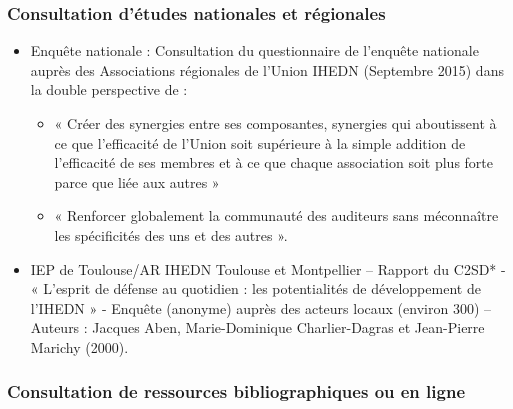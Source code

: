 \documentclass[10pt,a4paper]{article}
\begin{document}
\subsubsection{Consultation d'études nationales et régionales}

\begin{itemize}
\item Enquête nationale : Consultation du questionnaire de l'enquête nationale auprès des Associations régionales de l'Union IHEDN (Septembre 2015) dans la double perspective de :

\begin{itemize}
\item « Créer des synergies entre ses composantes, synergies qui aboutissent à ce que l'efficacité de l'Union soit supérieure à la simple addition de l'efficacité de ses membres et à ce que chaque association soit plus forte parce que liée aux autres »
\item « Renforcer globalement la communauté des auditeurs sans méconnaître les spécificités des uns et des autres ».
\end{itemize}

\item IEP de Toulouse/AR IHEDN Toulouse et Montpellier -- Rapport du C2SD* - « L'esprit de défense au quotidien : les potentialités de développement de l'IHEDN » - Enquête (anonyme) auprès des acteurs locaux (environ 300) -- Auteurs : Jacques Aben, Marie-Dominique Charlier-Dagras et Jean-Pierre Marichy (2000).
\end{itemize}

\subsubsection{Consultation de ressources bibliographiques ou en ligne}
\end{document}
